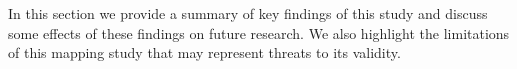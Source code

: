 In this section we provide a summary of key findings of this study and discuss some effects of these findings on future research. We also highlight the limitations of this mapping study that may represent threats to its validity.
